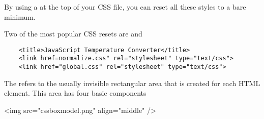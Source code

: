 By using a  at the top of your CSS file, you can reset all these styles
to a bare minimum. 


Two of the most popular CSS resets are 
and 

\begin{verbatim}
    <title>JavaScript Temperature Converter</title>
    <link href=normalize.css" rel="stylesheet" type="text/css">
    <link href="global.css" rel="stylesheet" type="text/css">
\end{verbatim}


The  refers to the usually invisible rectangular area that is created for each HTML element. This area has four basic components

\begin{rawhtml}
<img src="cssboxmodel.png" align="middle" />
\end{rawhtml}


